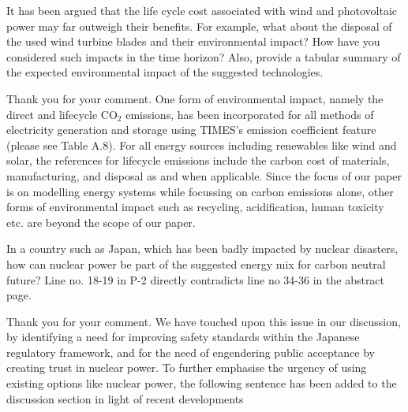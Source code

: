 \documentclass[answers,11pt]{exam}
\begin{document}
\begin{questions}
\begin{solution}
                 
        \end{solution}
        
      
                        \question It has been argued that the life cycle cost associated with wind and photovoltaic power may far outweigh  their benefits. For example, what about the disposal of the used wind turbine blades and their environmental impact? How have you considered such impacts in the time horizon? Also, provide a tabular summary of the expected environmental impact of the suggested technologies. 
        
        \begin{solution}
        
                 Thank you for your comment. One form of environmental impact, namely the direct and lifecycle CO$_2$ emissions, has been incorporated for all methods of electricity generation and storage using TIMES's emission coefficient feature (please see Table A.8). For all energy sources including renewables like wind and solar, the references for lifecycle emissions include the carbon cost of materials, manufacturing, and disposal as and when applicable. Since the focus of our paper is on modelling energy systems while focussing on carbon emissions alone, other forms of environmental impact such as recycling, acidification, human toxicity etc. are beyond the scope of our paper.
                 
                 
        \end{solution}

                        \question In a country such as Japan, which has been badly impacted by nuclear disasters, how can nuclear power be part of the suggested energy mix for carbon neutral future? Line no. 18-19 in P-2 directly contradicts line no 34-36 in the abstract page.
        
        \begin{solution}
        
                 Thank you for your comment. We have touched upon this issue in our discussion, by identifying a need for improving safety standards within the Japanese regulatory framework, and for the need of engendering public acceptance by creating trust in nuclear power. To further emphasise the urgency of using existing options like nuclear power, the following sentence has been added to the discussion section in light of recent developments
                 

\end{solution}
\end{questions}
\end{document}
